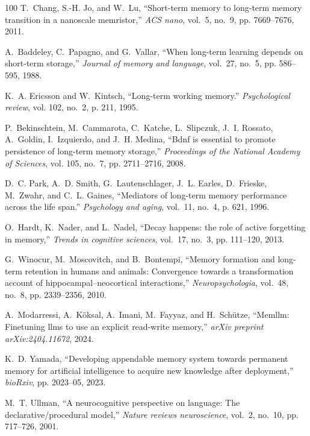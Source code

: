 \documentclass[10pt,journal,compsoc]{IEEEtran}
\begin{document}
\begin{thebibliography}{100}
	T.~Chang, S.-H. Jo, and W.~Lu, ``Short-term memory to long-term memory
	transition in a nanoscale memristor,'' \emph{ACS nano}, vol.~5, no.~9, pp.
	7669--7676, 2011.
	
	A.~Baddeley, C.~Papagno, and G.~Vallar, ``When long-term learning depends on
	short-term storage,'' \emph{Journal of memory and language}, vol.~27, no.~5,
	pp. 586--595, 1988.
	
	K.~A. Ericsson and W.~Kintsch, ``Long-term working memory.''
	\emph{Psychological review}, vol. 102, no.~2, p. 211, 1995.
	
	P.~Bekinschtein, M.~Cammarota, C.~Katche, L.~Slipczuk, J.~I. Rossato,
	A.~Goldin, I.~Izquierdo, and J.~H. Medina, ``Bdnf is essential to promote
	persistence of long-term memory storage,'' \emph{Proceedings of the National
		Academy of Sciences}, vol. 105, no.~7, pp. 2711--2716, 2008.
	
	D.~C. Park, A.~D. Smith, G.~Lautenschlager, J.~L. Earles, D.~Frieske, M.~Zwahr,
	and C.~L. Gaines, ``Mediators of long-term memory performance across the life
	span.'' \emph{Psychology and aging}, vol.~11, no.~4, p. 621, 1996.
	
	O.~Hardt, K.~Nader, and L.~Nadel, ``Decay happens: the role of active
	forgetting in memory,'' \emph{Trends in cognitive sciences}, vol.~17, no.~3,
	pp. 111--120, 2013.
	
	G.~Winocur, M.~Moscovitch, and B.~Bontempi, ``Memory formation and long-term
	retention in humans and animals: Convergence towards a transformation account
	of hippocampal--neocortical interactions,'' \emph{Neuropsychologia}, vol.~48,
	no.~8, pp. 2339--2356, 2010.
	
	A.~Modarressi, A.~K{\"o}ksal, A.~Imani, M.~Fayyaz, and H.~Sch{\"u}tze,
	``Memllm: Finetuning llms to use an explicit read-write memory,'' \emph{arXiv
		preprint arXiv:2404.11672}, 2024.
	
	K.~D. Yamada, ``Developing appendable memory system towards permanent memory
	for artificial intelligence to acquire new knowledge after deployment,''
	\emph{bioRxiv}, pp. 2023--05, 2023.
	
	M.~T. Ullman, ``A neurocognitive perspective on language: The
	declarative/procedural model,'' \emph{Nature reviews neuroscience}, vol.~2,
	no.~10, pp. 717--726, 2001.
	

\end{thebibliography}
\end{document}
